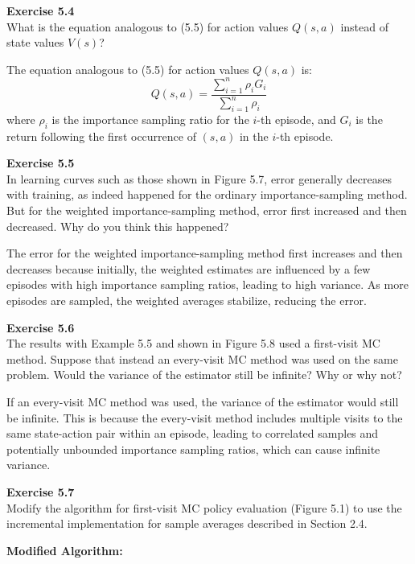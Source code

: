 \documentclass[addpoints]{exam}
\begin{document}
\begin{questions}
    \question
    \textbf{Exercise 5.4} \\ What is the equation analogous to (5.5) for action values \( Q(s, a) \) instead of state values \( V(s) \)?
    \begin{solution}
        The equation analogous to (5.5) for action values \( Q(s, a) \) is:
        \[
        Q(s, a) = \frac{\sum_{i=1}^{n} \rho_i G_i}{\sum_{i=1}^{n} \rho_i}
        \]
        where \( \rho_i \) is the importance sampling ratio for the \( i \)-th episode, and \( G_i \) is the return following the first occurrence of \( (s, a) \) in the \( i \)-th episode.
    \end{solution}

    \question
    \textbf{Exercise 5.5} \\ In learning curves such as those shown in Figure 5.7, error generally decreases with training, as indeed happened for the ordinary importance-sampling method. But for the weighted importance-sampling method, error first increased and then decreased. Why do you think this happened?
    \begin{solution}
        The error for the weighted importance-sampling method first increases and then decreases because initially, the weighted estimates are influenced by a few episodes with high importance sampling ratios, leading to high variance. As more episodes are sampled, the weighted averages stabilize, reducing the error.
    \end{solution}

    \question
    \textbf{Exercise 5.6} \\ The results with Example 5.5 and shown in Figure 5.8 used a first-visit MC method. Suppose that instead an every-visit MC method was used on the same problem. Would the variance of the estimator still be infinite? Why or why not?
    \begin{solution}
        If an every-visit MC method was used, the variance of the estimator would still be infinite. This is because the every-visit method includes multiple visits to the same state-action pair within an episode, leading to correlated samples and potentially unbounded importance sampling ratios, which can cause infinite variance.
    \end{solution}

    \question
    \textbf{Exercise 5.7} \\ Modify the algorithm for first-visit MC policy evaluation (Figure 5.1) to use the incremental implementation for sample averages described in Section 2.4.
    \begin{solution}
        \textbf{Modified Algorithm:}


\end{solution}
\end{questions}
\end{document}
